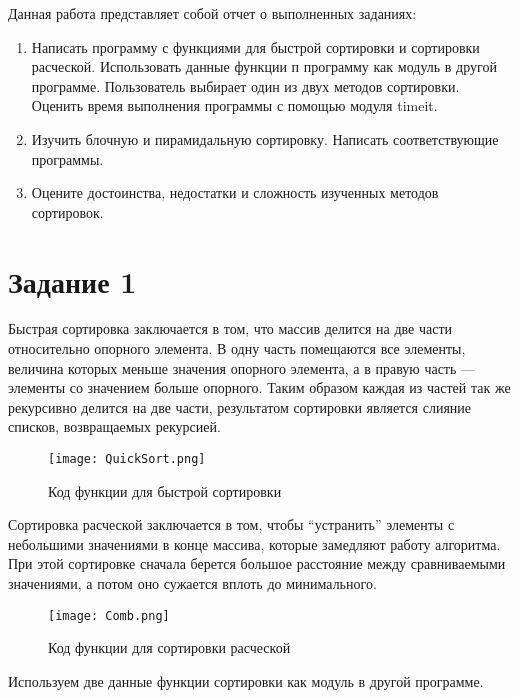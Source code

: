 \documentclass[14pt]{extreport}
\begin{document}
\pagestyle{empty}

\pagestyle{plain}

\tableofcontents

\intro

Данная работа представляет собой отчет о выполненных заданиях:
\begin{enumerate}
\item Написать программу с функциями для быстрой сортировки и сортировки расческой. Использовать данные функции п программу как модуль в другой программе. Пользователь выбирает один из двух методов сортировки. Оценить время выполнения программы с помощью модуля timeit.
\item Изучить блочную и пирамидальную сортировку. Написать соответствующие программы.
\item Оцените достоинства, недостатки и сложность изученных методов сортировок.
\end{enumerate}

\chapter{Задание 1}

Быстрая сортировка заключается в том, что массив делится на две части относительно опорного элемента. В одну часть помещаются все элементы, величина которых меньше значения опорного элемента, а в правую часть — элементы со значением больше опорного. Таким образом каждая из частей так же рекурсивно делится на две части, результатом сортировки является слияние списков, возвращаемых рекурсией.

\begin{figure}[H]
\centerline{\texttt{[image: QuickSort.png]}}
\caption{Код функции для быстрой сортировки}
\label{fig11}
\end{figure}

Сортировка расческой заключается в том, чтобы “устранить” элементы с небольшими значениями в конце массива, которые замедляют работу алгоритма. При этой сортировке сначала берется большое расстояние между сравниваемыми значениями, а потом оно сужается вплоть до минимального.

\begin{figure}[H]
\centerline{\texttt{[image: Comb.png]}}
\caption{Код функции для сортировки расческой}
\label{fig12}
\end{figure}

Используем две данные функции сортировки как модуль в другой программе.
\end{document}
